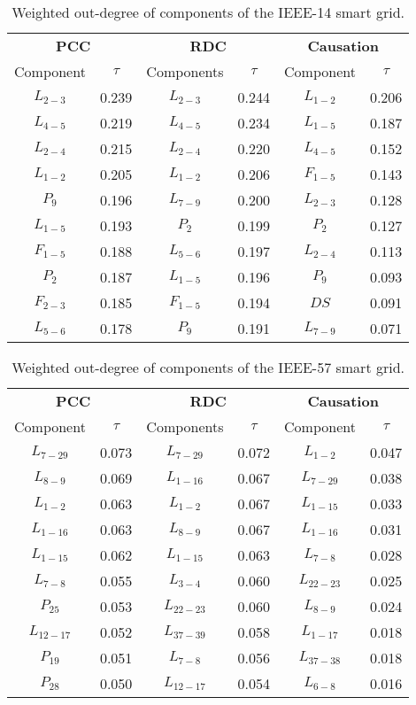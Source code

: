 \begin{table}[H]
\centering
\caption{Weighted out-degree of components of the IEEE-14 smart grid.}
\label{tab:tau_ieee14}
\footnotesize
\begin{tabular}{cc|cc|cc}
\multicolumn{2}{c}{\textbf{PCC}} & \multicolumn{2}{c}{\textbf{RDC}} & \multicolumn{2}{c}{\textbf{Causation}} \\
Component & $\tau$ & Components & $\tau$ & Component & $\tau$ \\ \hline
$L_{2-3}$ & 0.239 & $L_{2-3}$ & 0.244 & $L_{1-2}$ & 0.206 \\
$L_{4-5}$ & 0.219 & $L_{4-5}$ & 0.234 & $L_{1-5}$ & 0.187 \\
$L_{2-4}$ & 0.215 & $L_{2-4}$ & 0.220 & $L_{4-5}$ & 0.152 \\
$L_{1-2}$ & 0.205 & $L_{1-2}$ & 0.206 & $F_{1-5}$ & 0.143 \\
$P_{9}$ & 0.196 & $L_{7-9}$ & 0.200 & $L_{2-3}$ & 0.128 \\
$L_{1-5}$ & 0.193 & $P_{2}$ & 0.199 & $P_{2}$ & 0.127 \\
$F_{1-5}$ & 0.188 & $L_{5-6}$ & 0.197 & $L_{2-4}$ & 0.113 \\
$P_{2}$ & 0.187 & $L_{1-5}$ & 0.196 & $P_{9}$ & 0.093 \\
$F_{2-3}$ & 0.185 & $F_{1-5}$ & 0.194 & $DS$ & 0.091 \\
$L_{5-6}$ & 0.178 & $P_{9}$ & 0.191 & $L_{7-9}$ & 0.071
\end{tabular}
\end{table}

\begin{table}[H]
\centering
\caption{Weighted out-degree of components of the IEEE-57 smart grid.}
\label{tab:tau_ieee57}
\footnotesize
\begin{tabular}{cc|cc|cc}
\multicolumn{2}{c}{\textbf{PCC}} & \multicolumn{2}{c}{\textbf{RDC}} & \multicolumn{2}{c}{\textbf{Causation}} \\
Component & $\tau$ & Components & $\tau$ & Component & $\tau$ \\ \hline
$L_{7-29}$ & 0.073 & $L_{7-29}$ & 0.072 & $L_{1-2}$ & 0.047 \\
$L_{8-9}$ & 0.069 & $L_{1-16}$ & 0.067 & $L_{7-29}$ & 0.038 \\
$L_{1-2}$ & 0.063 & $L_{1-2}$ & 0.067 & $L_{1-15}$ & 0.033 \\
$L_{1-16}$ & 0.063 & $L_{8-9}$ & 0.067 & $L_{1-16}$ & 0.031 \\
$L_{1-15}$ & 0.062 & $L_{1-15}$ & 0.063 & $L_{7-8}$ & 0.028 \\
$L_{7-8}$ & 0.055 & $L_{3-4}$ & 0.060 & $L_{22-23}$ & 0.025 \\
$P_{25}$ & 0.053 & $L_{22-23}$ & 0.060 & $L_{8-9}$ & 0.024 \\
$L_{12-17}$ & 0.052 & $L_{37-39}$ & 0.058 & $L_{1-17}$ & 0.018 \\
$P_{19}$ & 0.051 & $L_{7-8}$ & 0.056 & $L_{37-38}$ & 0.018 \\
$P_{28}$ & 0.050 & $L_{12-17}$ & 0.054 & $L_{6-8}$ & 0.016
\end{tabular}
\end{table} 